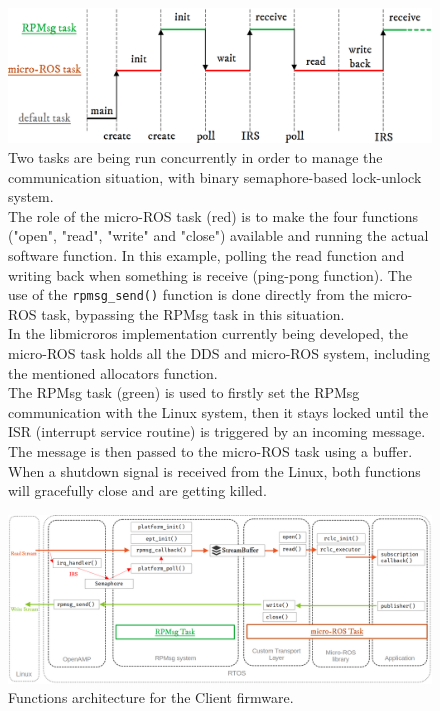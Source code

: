 \documentclass[10pt]{article}
\begin{document}
\begin{figure}[htbp]
\centering
\includegraphics[width=.9\textwidth]{./img/tasks.png}
\caption{\label{fig:org82f1d15}Two tasks are being run concurrently in order to manage the communication situation, with binary semaphore-based lock-unlock system.\\[0pt]
 The role of the micro-ROS task (red) is to make the four functions ("open", "read", "write" and "close")  available and running the actual software function. In this example, polling the read function and writing back when something is receive (ping-pong function). The use of the \texttt{rpmsg\_send()} function is done directly from the micro-ROS task, bypassing the RPMsg task in this situation.\\[0pt]
 In the libmicroros implementation currently being developed, the micro-ROS task holds all the DDS and micro-ROS system, including the mentioned allocators function.\\[0pt]
 The RPMsg task (green) is used to firstly set the RPMsg communication with the Linux system, then it stays locked until the ISR (interrupt service routine) is triggered by an incoming message. The message is then passed to the micro-ROS task using a buffer.\\[0pt]
 When a shutdown signal is received from the Linux, both functions will gracefully close and are getting killed.}
\end{figure}

\begin{figure}[htbp]
\centering
\includegraphics[width=.9\textwidth]{./img/client_arch.png}
\caption{\label{fig:org25cb722}Functions architecture for the Client firmware.}
\end{figure}
\end{document}
